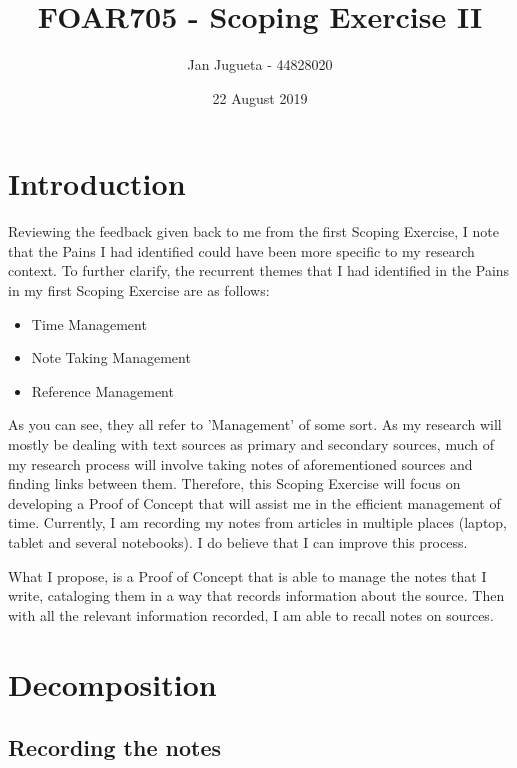 \documentclass{article}
\title{FOAR705 - Scoping Exercise II}
\author{Jan Jugueta - 44828020}
\date{22 August 2019}
\begin{document}
\maketitle

\section{Introduction}

Reviewing the feedback given back to me from the first Scoping Exercise, I note that the Pains I had identified could have been more specific to my research context. To further clarify, the recurrent themes that I had identified in the Pains in my first Scoping Exercise are as follows:
\begin{itemize}
    \item Time Management
    \item Note Taking Management
    \item Reference Management
\end{itemize}

As you can see, they all refer to 'Management' of some sort. As my research will mostly be dealing with text sources as primary and secondary sources, much of my research process will involve taking notes of aforementioned sources and finding links between them. Therefore, this Scoping Exercise will focus on developing a Proof of Concept that will assist me in the efficient management of time. Currently, I am recording my notes from articles in multiple places (laptop, tablet and several notebooks). I do believe that I can improve this process.

What I propose, is a Proof of Concept that is able to manage the notes that I write, cataloging them in a way that records information about the source. Then with all the relevant information recorded, I am able to recall notes on sources.

\section{Decomposition}

\subsection{Recording the notes}
\end{document}
